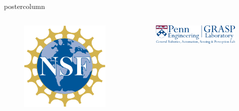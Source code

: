 \documentclass[final,hyperref={pdfpagelabels=false},5pt]{beamer}
\begin{document}
\begin{frame}
\begin{columns}
\begin{column}{.49\textwidth}
\begin{beamercolorbox}[center,wd=\textwidth]{postercolumn}
\begin{minipage}[T]{.95\textwidth}
{\begin{columns}[c]
\begin{column}{.25\textwidth}
\begin{figure}
					\includegraphics[width=\textwidth]{NSFLogo}
				\end{figure}
				\end{column}
				\begin{column}{.64\textwidth}
				\centering
				\begin{figure}
				\centering
					\includegraphics[width=\textwidth]{grasp_logo1_blue}
				\end{figure}

				\end{column}
				\end{columns}
				

    
          }
        \end{minipage}
        
      \end{beamercolorbox}
      
    \end{column}


\end{columns}
\end{frame}
\end{document}
